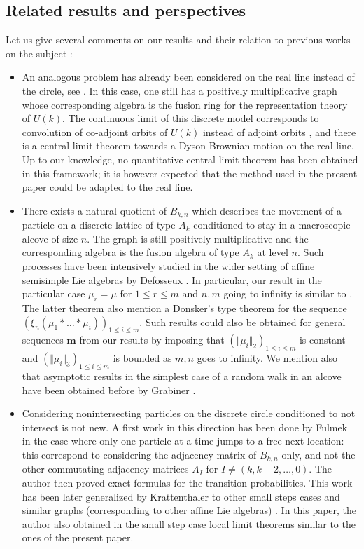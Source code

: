 \documentclass[10pt,11pt]{amsart}%
\begin{document}
\subsection{Related results and perspectives}
Let us give several comments on our results and their relation to previous works on the subject :
\begin{itemize}
\item An analogous problem has already been considered on the real line instead of the circle, see \cite{Bi,BG}. In this case, one still has a positively multiplicative graph whose corresponding algebra is the fusion ring for the representation theory of $U(k)$. The continuous limit of this discrete model corresponds to convolution of co-adjoint orbits of $U(k)$ instead of adjoint orbits \cite{Gra,BJ}, and there is a central limit theorem towards a Dyson Brownian motion on the real line. Up to our knowledge, no quantitative central limit theorem has been obtained in this framework; it is however expected that the method used in the present paper could be adapted to the real line.
\item There exists a natural quotient of $B_{k,n}$ which describes the movement of a particle on a discrete lattice of type $A_k$ conditioned to stay in a macroscopic alcove of size $n$. The graph is still positively multiplicative and the corresponding algebra is the fusion algebra of type $A_k$ at level $n$. Such processes have been intensively studied in the wider setting of affine semisimple Lie algebras by Defosseux \cite{De}. In particular, our result in the particular case $\mu_r=\mu$ for $1\leq r\leq m$ and $n,m$ going to infinity is similar to \cite[Theorem 8.1]{De}. The latter theorem also mention a Donsker's type theorem for the sequence $(\xi_n(\mu_1*\dots*\mu_i))_{1\leq i\leq m}$. Such results could also be obtained for general sequences $\mathbf{m}$ from our results by imposing that $(\Vert \mu_i\Vert_2)_{1\leq i\leq m}$ is constant and $(\Vert \mu_i\Vert_3)_{1\leq i\leq m}$ is bounded as $m,n$ goes to infinity. We mention also that asymptotic results in the simplest case of a random walk in an alcove have been obtained before by Grabiner \cite{Gra2}.
\item Considering nonintersecting particles on the discrete circle conditioned to not intersect is not new. A first work in this direction has been done by Fulmek \cite{Fulm} in the case where only one particle at a time jumps to a free next location: this correspond to considering the adjacency matrix of $B_{k,n}$ only, and not the other commutating adjacency matrices $A_I$ for $I\not=(k,k-2,\ldots,0)$. The author then proved exact formulas for the transition probabilities. This work has been later generalized by Krattenthaler to other small steps cases and similar graphs (corresponding to other affine Lie algebras) \cite{Kra}. In this paper, the author also obtained in the small step case local limit theorems similar to the ones of the present paper.


\end{itemize}
\end{document}
